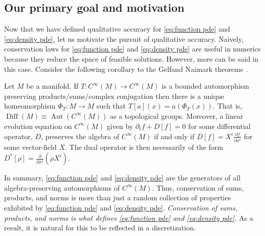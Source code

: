 \documentclass[final,leqno]{siamart}
\newcommand{\pder}[2]{\ensuremath{\frac{ \partial #1}{\partial #2}}}
\DeclareMathOperator{\Diff}{Diff}
\begin{document}
\subsection{Our primary goal and motivation}
Now that we have defined qualitative accuracy for \eqref{eq:function pde} and \eqref{eq:density pde}, let us motivate the pursuit of qualitative accuracy.
Naively, conservation laws for \eqref{eq:function pde} and \eqref{eq:density pde} are useful in numerics because they reduce the space of feasible solutions.
However, more can be said in this case.
Consider the following corollary to the Gelfand Naimark theorems~\cite{GelfandNaimark1943}.


\begin{proposition}
	Let $M$ be a manifold.
	If $T: C^\infty(M) \to C^\infty(M)$ is a bounded automorphism preserving products/sums/complex conjugation
	then there is a unique homeomorphism $\Phi_{T}:M \to M$ such that $T[a](x) = a( \Phi_{T}(x) )$.
	That is, $\Diff(M) \equiv \operatorname{Aut}( C^{\infty}(M) )$ as a topological groups.
	Moreover, a linear evolution equation on $C^{\infty}(M)$ given by $\partial_{t} f + D[f] = 0$ for some differential operator, $D$,
	preserves  the algebra of $C^\infty(M)$ if and only if $D[f] = X^{i} \pder{f}{x^{i}}$ for some vector-field $X$.
	The dual operator is then necessarily of the form $D^{*}[\rho] = \pder{}{x^{i}}( \rho X^{i})$.
\end{proposition}

In summary, \eqref{eq:function pde} and \eqref{eq:density pde} are the generators of all algebra-preserving automorphisms of $C^\infty(M)$.
Thus, conservation of sums, products, and norms is more than just a random collection of properties exhibited by \eqref{eq:function pde} and \eqref{eq:density pde}.
\emph{Conservation of sums, products, and norms is what defines \eqref{eq:function pde} and \eqref{eq:density pde}.}
As a result, it is natural for this to be reflected in a discretization.
\end{document}
